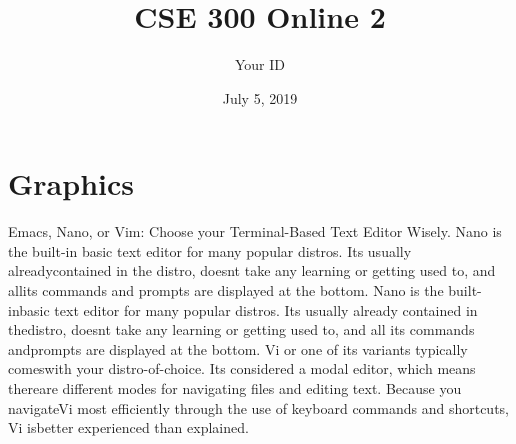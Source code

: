 \documentclass[a4paper]{article}
\title{CSE 300 Online 2}
\author{Your ID}
\date{July 5, 2019}
\begin{document}
\maketitle
\section{Graphics}
Emacs, Nano, or Vim:  Choose your Terminal-Based Text Editor Wisely.
Nano is the built-in basic text editor for many popular distros. 
 Its usually alreadycontained  in  the  distro, 
  doesnt  take  any  learning  or  getting  used  to,
   and  allits commands and prompts are displayed at the bottom. 
  Nano is the built-inbasic text editor for many popular distros.  Its usually already contained in thedistro, doesnt take any learning or getting used to, and all its commands andprompts are displayed at the bottom.  Vi or one of its variants typically comeswith  your  distro-of-choice.   Its  considered  a  modal  editor,  which  means  thereare different modes for navigating files and editing text.  Because you navigateVi most efficiently through the use of keyboard commands and shortcuts, Vi isbetter experienced than explained.
\end{document}
